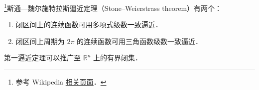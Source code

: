 
\footnote{参考 Wikipedia \href{https://en.wikipedia.org/wiki/Stone%E2%80%93Weierstrass_theorem}{相关页面}．}斯通—魏尔施特拉斯逼近定理（Stone–Weierstrass theorem）有两个：
\begin{enumerate}
\item 闭区间上的连续函数可用多项式级数一致逼近．
\item 闭区间上周期为 $2\pi$ 的连续函数可用三角函数级数一致逼近．
\end{enumerate}
第一逼近定理可以推广至 $\mathbb {R}^{n}$ 上的有界闭集．
